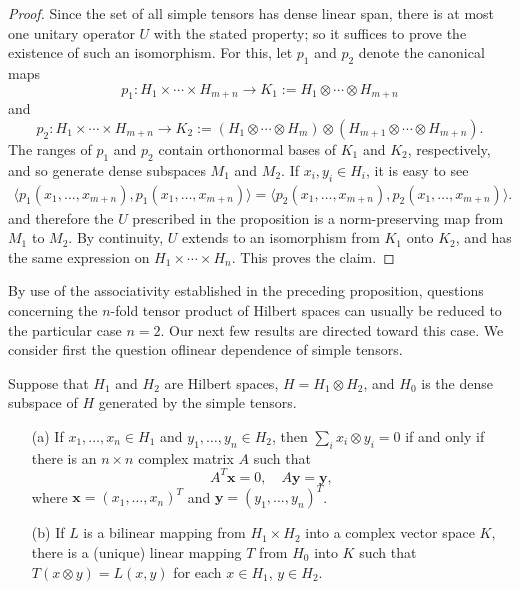 \begin{proof}
Since the set of all simple tensors has dense linear span, there is at most one unitary operator $U$ with the stated property; so it suffices to prove the existence of such an isomorphism. For this, let $p_1$ and $p_2$ denote the canonical maps
\[p_1:H_1\times\cdots\times H_{m+n}\to K_1:=H_1\otimes\cdots\otimes H_{m+n}\]
and
\[p_2:H_1\times\cdots\times H_{m+n}\to K_2:=(H_1\otimes\cdots\otimes H_m)\otimes(H_{m+1}\otimes\cdots\otimes H_{m+n}).\]
The ranges of $p_1$ and $p_2$ contain orthonormal bases of $K_1$ and $K_2$, respectively, and so generate dense subspaces $M_1$ and $M_2$. If $x_i,y_i\in H_i$, it is easy to see
\begin{align*}
\langle p_1(x_1,\dots,x_{m+n}),p_1(x_1,\dots,x_{m+n})\rangle=\langle p_2(x_1,\dots,x_{m+n}),p_2(x_1,\dots,x_{m+n})\rangle.
\end{align*}
and therefore the $U$ prescribed in the proposition is a norm-preserving map from $M_1$ to $M_2$. By continuity, $U$ extends to an isomorphism from $K_1$ onto $K_2$, and has the same expression on $H_1\times\cdots\times H_n$. This proves the claim.
\end{proof}
By use of the associativity established in the preceding proposition,
questions concerning the $n$-fold tensor product of Hilbert spaces can usually be reduced to the particular case $n=2$. Our next few results are directed toward this case. We consider first the question oflinear dependence of simple tensors.
\begin{proposition}\label{Hilbert space tensor product is algebraic}
Suppose that $H_1$ and $H_2$ are Hilbert spaces, $H=H_1\otimes H_2$, and $H_0$ is the dense subspace of $H$ generated by the simple tensors.
\begin{itemize}
\item[(a)] If $x_1,\dots,x_n\in H_1$ and $y_1,\dots,y_n\in H_2$, then $\sum_ix_i\otimes y_i=0$ if and only if there is an $n\times n$ complex matrix $A$ such that
\[A^T\bm{x}=0,\quad A\bm{y}=\bm{y},\]
where $\bm{x}=(x_1,\dots,x_n)^T$ and $\bm{y}=(y_1,\dots,y_n)^T$.
\item[(b)] If $L$ is a bilinear mapping from $H_1\times H_2$ into a complex vector space $K$, there is a (unique) linear mapping $T$ from $H_0$ into $K$ such that $T(x\otimes y)=L(x,y)$ for each $x\in H_1$, $y\in H_2$.
\end{itemize}
\end{proposition}
